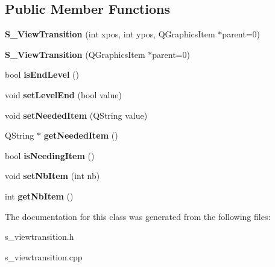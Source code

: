 \subsection*{Public Member Functions}
\begin{DoxyCompactItemize}
\item 
\hypertarget{class_s___view_transition_a114168f77853ed98ff87d750f2982b39}{}{\bfseries S\+\_\+\+View\+Transition} (int xpos, int ypos, Q\+Graphics\+Item $\ast$parent=0)\label{class_s___view_transition_a114168f77853ed98ff87d750f2982b39}

\item 
\hypertarget{class_s___view_transition_a95dbe7a7f23bb8ed903ad8dff6f7ea6a}{}{\bfseries S\+\_\+\+View\+Transition} (Q\+Graphics\+Item $\ast$parent=0)\label{class_s___view_transition_a95dbe7a7f23bb8ed903ad8dff6f7ea6a}

\item 
\hypertarget{class_s___view_transition_ab6671a5c3df741a34c2cff8194c8c428}{}bool {\bfseries is\+End\+Level} ()\label{class_s___view_transition_ab6671a5c3df741a34c2cff8194c8c428}

\item 
\hypertarget{class_s___view_transition_afbfd78f5dcb2edb6b5444c4e2a73110a}{}void {\bfseries set\+Level\+End} (bool value)\label{class_s___view_transition_afbfd78f5dcb2edb6b5444c4e2a73110a}

\item 
\hypertarget{class_s___view_transition_af81ef15e45fb55bc71e3e81acb88971a}{}void {\bfseries set\+Needed\+Item} (Q\+String value)\label{class_s___view_transition_af81ef15e45fb55bc71e3e81acb88971a}

\item 
\hypertarget{class_s___view_transition_af4feeaa72ce0325a7bd57dff718a02e8}{}Q\+String $\ast$ {\bfseries get\+Needed\+Item} ()\label{class_s___view_transition_af4feeaa72ce0325a7bd57dff718a02e8}

\item 
\hypertarget{class_s___view_transition_a9f623ff7ddaa749fe32af0149e4dc7b7}{}bool {\bfseries is\+Needing\+Item} ()\label{class_s___view_transition_a9f623ff7ddaa749fe32af0149e4dc7b7}

\item 
\hypertarget{class_s___view_transition_a5926082bed3cb63fd6eea5e6d2cfb875}{}void {\bfseries set\+Nb\+Item} (int nb)\label{class_s___view_transition_a5926082bed3cb63fd6eea5e6d2cfb875}

\item 
\hypertarget{class_s___view_transition_aadf7b185d779366bc93d20856e0985c3}{}int {\bfseries get\+Nb\+Item} ()\label{class_s___view_transition_aadf7b185d779366bc93d20856e0985c3}

\end{DoxyCompactItemize}


The documentation for this class was generated from the following files\+:\begin{DoxyCompactItemize}
\item 
s\+\_\+viewtransition.\+h\item 
s\+\_\+viewtransition.\+cpp\end{DoxyCompactItemize}
